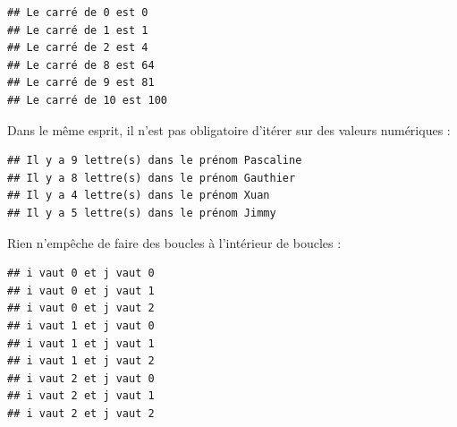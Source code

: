 \documentclass[12pt,]{book}
\newenvironment{Shaded}{\begin{snugshade}}{\end{snugshade}}
\newcommand{\KeywordTok}[1]{\textcolor[rgb]{0.13,0.29,0.53}{\textbf{#1}}}
\newcommand{\DecValTok}[1]{\textcolor[rgb]{0.00,0.00,0.81}{#1}}
\newcommand{\SpecialCharTok}[1]{\textcolor[rgb]{0.00,0.00,0.00}{#1}}
\newcommand{\StringTok}[1]{\textcolor[rgb]{0.31,0.60,0.02}{#1}}
\newcommand{\ControlFlowTok}[1]{\textcolor[rgb]{0.13,0.29,0.53}{\textbf{#1}}}
\newcommand{\OperatorTok}[1]{\textcolor[rgb]{0.81,0.36,0.00}{\textbf{#1}}}
\newcommand{\BuiltInTok}[1]{#1}
\newcommand{\NormalTok}[1]{#1}
\numberwithin{equation}{section}
\numberwithin{countremarque}{section}
\begin{document}
\begin{lstlisting}
## Le carré de 0 est 0
## Le carré de 1 est 1
## Le carré de 2 est 4
## Le carré de 8 est 64
## Le carré de 9 est 81
## Le carré de 10 est 100
\end{lstlisting}

Dans le même esprit, il n'est pas obligatoire d'itérer sur des valeurs
numériques :

\begin{Shaded}
\end{Shaded}

\begin{lstlisting}
## Il y a 9 lettre(s) dans le prénom Pascaline
## Il y a 8 lettre(s) dans le prénom Gauthier
## Il y a 4 lettre(s) dans le prénom Xuan
## Il y a 5 lettre(s) dans le prénom Jimmy
\end{lstlisting}

Rien n'empêche de faire des boucles à l'intérieur de boucles :

\begin{Shaded}
\end{Shaded}

\begin{lstlisting}
## i vaut 0 et j vaut 0
## i vaut 0 et j vaut 1
## i vaut 0 et j vaut 2
## i vaut 1 et j vaut 0
## i vaut 1 et j vaut 1
## i vaut 1 et j vaut 2
## i vaut 2 et j vaut 0
## i vaut 2 et j vaut 1
## i vaut 2 et j vaut 2
\end{lstlisting}
\end{document}
